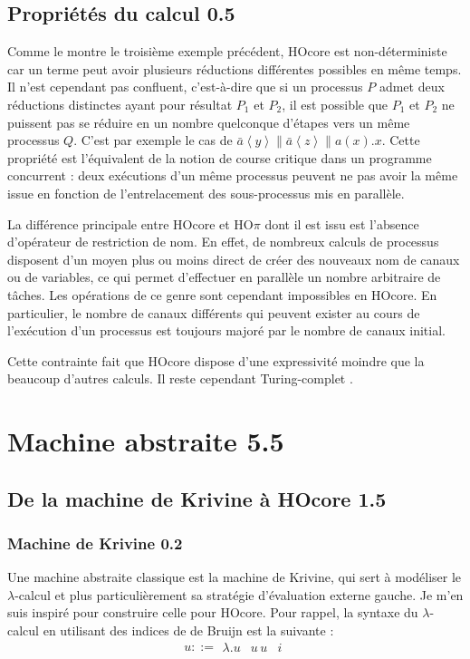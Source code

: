 \documentclass[11pt]{article}
\newcommand{\send}[2]{\bar{#1}\left\langle #2\right\rangle}
\newcounter{c_theo}
\newcounter{c_def}
\begin{document}
\subsection{Propriétés du calcul 0.5}
\label{sec-2-2}

Comme le montre le troisième exemple précédent, HOcore est non-déterministe car un terme peut avoir plusieurs réductions différentes possibles en même temps.
Il n'est cependant pas confluent, c'est-à-dire que si un processus $P$ admet deux réductions distinctes ayant pour résultat $P_1$ et $P_2$, il est possible que $P_1$ et $P_2$ ne puissent pas se réduire en un nombre quelconque d'étapes vers un même processus $Q$. C'est par exemple le cas de $\send{a}y\parallel \send{a}z\parallel a(x).x$.
Cette propriété est l'équivalent de la notion de course critique dans un programme concurrent : deux exécutions d'un même processus peuvent ne pas avoir la même issue en fonction de l'entrelacement des sous-processus mis en parallèle.

La différence principale entre HOcore et HO$\pi$ dont il est issu est l'absence d'opérateur de restriction de nom.
En effet, de nombreux calculs de processus disposent d'un moyen plus ou moins direct de créer des nouveaux nom de canaux ou de variables, ce qui permet d'effectuer en parallèle un nombre arbitraire de tâches.
Les opérations de ce genre sont cependant impossibles en HOcore. En particulier, le nombre de canaux différents qui peuvent exister au cours de l'exécution d'un processus est toujours majoré par le nombre de canaux initial.

Cette contrainte fait que HOcore dispose d'une expressivité moindre que la beaucoup d'autres calculs. Il reste cependant Turing-complet \cite{Lanese08}.

\section{Machine abstraite 5.5}
\label{sec-3}
\subsection{De la machine de Krivine à HOcore 1.5}
\label{sec-3-1}
\subsubsection{Machine de Krivine 0.2}
\label{sec-3-1-1}

Une machine abstraite classique est la machine de Krivine, qui sert à modéliser le $\lambda$-calcul et plus particulièrement sa stratégie d'évaluation externe gauche. Je m'en suis inspiré pour construire celle pour HOcore.
Pour rappel, la syntaxe du $\lambda$-calcul en utilisant des indices de de Bruijn est la suivante :
\[u::=\begin{array}{c|c|c}\lambda.u & u\, u & i\end{array}\]
\end{document}
